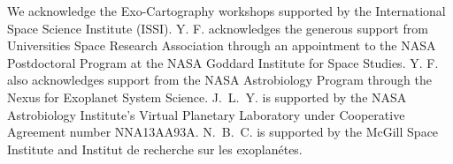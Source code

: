 \documentclass[iop,numberedappendix,apj]{emulateapj}
\begin{document}
\acknowledgements

We acknowledge the Exo-Cartography workshops supported by the International Space Science Institute (ISSI). 
Y. F. acknowledges the generous support from Universities Space Research Association through an appointment to the NASA Postdoctoral Program at the NASA Goddard Institute for Space Studies. 
Y. F. also acknowledges support from the NASA Astrobiology Program through the Nexus for Exoplanet System Science. 
J.~L.~Y. is supported by the NASA Astrobiology Institute's Virtual Planetary Laboratory under Cooperative Agreement number NNA13AA93A. 
N.~B.~C. is supported by the McGill Space Institute and Institut de recherche sur les exoplan\'etes.  


\end{document}
